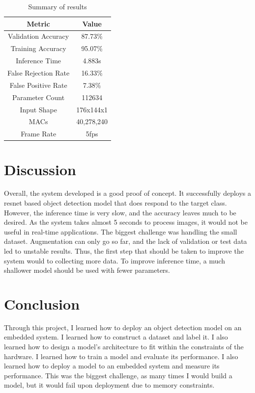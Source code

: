 \documentclass{article}
\begin{document}
\begin{table}[h]
    \begin{center}
    \begin{tabular}{|c|c|}
    \hline
    \textbf{Metric} & \textbf{Value} \\
    \hline
    Validation Accuracy & 87.73\% \\
    \hline
    Training Accuracy & 95.07\% \\
    \hline
    Inference Time & 4.883s \\
    \hline
    False Rejection Rate & 16.33\% \\
    \hline
    False Positive Rate & 7.38\% \\
    \hline
    Parameter Count & 112634 \\
    \hline
    Input Shape & 176x144x1 \\
    \hline
    MACs & 40,278,240 \\
    \hline
    Frame Rate & 5fps \\
    \hline
    \end{tabular}
    \caption{Summary of results}
    \label{tab:summary}
    \end{center}
\end{table}

\section{Discussion}
Overall, the system developed is a good proof of concept. It
successfully deploys a resnet based object detection model
that does respond to the target class. However, the
inference time is very slow, and the accuracy leaves much to
be desired. As the system takes almost 5 seconds to process
images, it would not be useful in real-time applications.
The biggest challenge was handling the small dataset.
Augmentation can only go so far, and the lack of validation
or test data led to unstable results. Thus, the first step
that should be taken to improve the system would to
collecting more data. To improve inference time, a much
shallower model should be used with fewer parameters.
\section{Conclusion}
Through this project, I learned how to deploy an object
detection model on an embedded system. I learned how to
construct a dataset and label it. I also learned how to
design a model's architecture to fit within the constraints
of the hardware. I learned how to train a model and evaluate
its performance. I also learned how to deploy a model to an
embedded system and measure its performance. This was the
biggest challenge, as many times I would build a model, but
it would fail upon deployment due to memory constraints.
\end{document}
